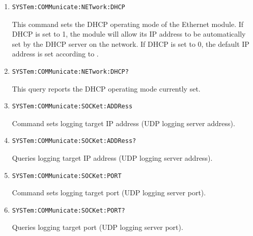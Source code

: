 \documentclass[a4paper,10pt]{article}
\begin{document}
\begin{enumerate}
\begin{enumerate}
		\item 
		    \begin{verbatim}SYSTem:COMMunicate:NETwork:DHCP\end{verbatim}
		    \begin{description}
		        This command sets the DHCP operating mode of the Ethernet module. If DHCP is set to 1, the module will allow its IP address to be automatically set by the DHCP server on the network. If DHCP is set to 0, the default IP address is set according to .
		    \end{description}
		\item 
		    \begin{verbatim}SYSTem:COMMunicate:NETwork:DHCP?\end{verbatim}
		    \begin{description}
		        This query reports the DHCP operating mode currently set.
		    \end{description}
		\item 
		    \begin{verbatim}SYSTem:COMMunicate:SOCKet:ADDRess\end{verbatim}
		    \begin{description}
		        Command sets logging target IP address (UDP logging server address). 
		    \end{description}
		\item 
		    \begin{verbatim}SYSTem:COMMunicate:SOCKet:ADDRess?\end{verbatim}
		    \begin{description}
		        Queries logging target IP address (UDP logging server address).
		    \end{description}
		\item
		    \begin{verbatim}SYSTem:COMMunicate:SOCKet:PORT\end{verbatim}
		    \begin{description}
		        Command sets logging target port (UDP logging server port).
		    \end{description}
		\item 
		    \begin{verbatim}SYSTem:COMMunicate:SOCKet:PORT?\end{verbatim}
		    \begin{description}
		        Queries logging target port (UDP logging server port).
		    \end{description}


\end{enumerate}
\end{enumerate}
\end{document}
